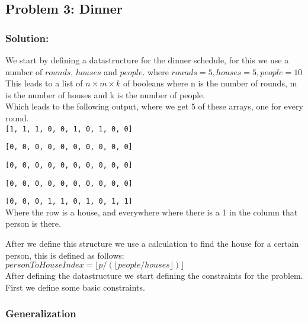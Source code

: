 \documentclass[12pt]{article}
\begin{document}
\subsection*{Problem 3: Dinner}

\subsubsection*{Solution:}

We start by defining a datastructure for the dinner schedule, for this we use a number of $rounds$, $houses$ and $people$. where $rounds = 5, houses=5, people=10$ \\
This leads to a list of $n \times m \times k$ of booleans where n is the number of rounds, m is the number of houses and k is the number of people. \\

Which leads to the following output, where we get 5 of these arrays, one for every round.\\

{\tt [1, 1, 1, 0, 0, 1, 0, 1, 0, 0]}

{\tt [0, 0, 0, 0, 0, 0, 0, 0, 0, 0]}

{\tt [0, 0, 0, 0, 0, 0, 0, 0, 0, 0]}

{\tt [0, 0, 0, 0, 0, 0, 0, 0, 0, 0]}

{\tt [0, 0, 0, 1, 1, 0, 1, 0, 1, 1]}\\

Where the row is a house, and everywhere where there is a 1 in the column that person is there.

After we define this structure we use a calculation to find the house for a certain person, this is defined as follows: \\

$personToHouseIndex = \lfloor p / (\lfloor people / houses \rfloor)\rfloor$ \\
                   
After defining the datastructure we start defining the constraints for the problem. \\

First we define some basic constraints. \\

\subsubsection*{Generalization}
\end{document}

